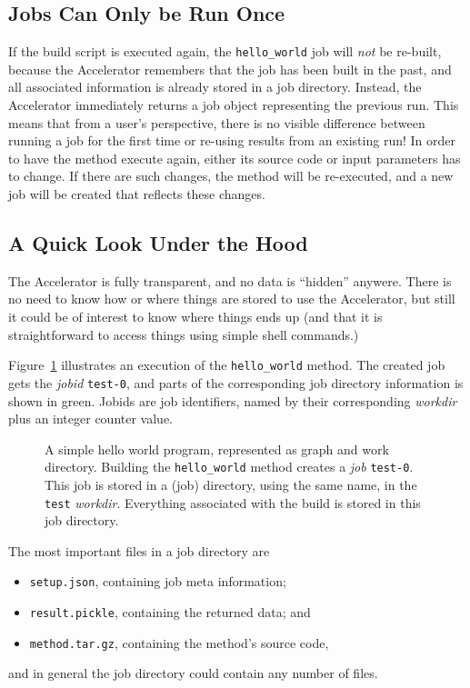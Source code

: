 \subsection{Jobs Can Only be Run Once}
If the build script is executed again, the \texttt{hello\_world} job
will \emph{not} be re-built, because the Accelerator remembers that
the job has been built in the past, and all associated information is
already stored in a job directory.  Instead, the Accelerator
immediately returns a job object representing the previous run.  This
means that from a user's perspective, there is no visible difference
between running a job for the first time or re-using results from an
existing run!  In order to have the method execute again, either its
source code or input parameters has to change.  If there are such
changes, the method will be re-executed, and a new job will be created
that reflects these changes.


\subsection{A Quick Look Under the Hood}
The Accelerator is fully transparent, and no data is ``hidden''
anywere.  There is no need to know how or where things are stored to
use the Accelerator, but still it could be of interest to know where
things ends up (and that it is straightforward to access things using
simple shell commands.)

Figure~\ref{fig:execflow-hello-world} illustrates an execution of the
\texttt{hello\_world} method.  The created job gets the \textsl{jobid}
\texttt{test-0}, and parts of the corresponding job directory
information is shown in green.  Jobids are job identifiers, named by
their corresponding \textsl{workdir} plus an integer counter value.

\clearpage

\begin{figure}[t]
  \hspace{1.5cm}
    \caption{A simple hello world program, represented as graph and
      work directory.  Building the \texttt{hello\_world} method
      creates a \emph{job} \texttt{test-0}.  This job is stored in a
      (job) directory, using the same name, in the \texttt{test}
      \emph{workdir}.  Everything associated with the build is stored
      in this job directory.}
    \label{fig:execflow-hello-world}
\end{figure}

The most important files in a job directory are
\begin{itemize}
\item[] \texttt{setup.json}, containing job meta information;
\item[] \texttt{result.pickle}, containing the returned data; and
\item[] \texttt{method.tar.gz}, containing the method's source code,
\end{itemize}
and in general the job directory could contain any number of files.

